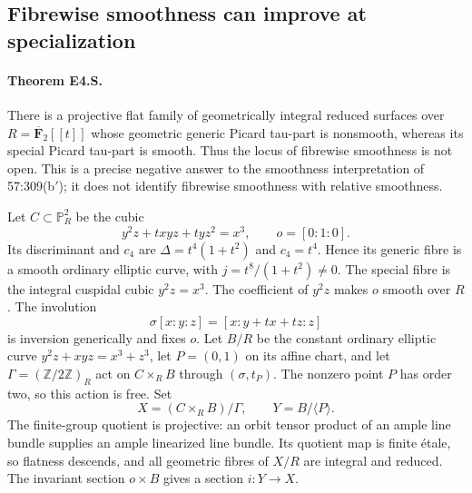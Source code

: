 \subsection{Fibrewise smoothness can improve at specialization}

\paragraph{Theorem E4.S.}
There is a projective flat family of geometrically integral reduced surfaces
over $R=\overline{\mathbf F}_2[[t]]$ whose geometric generic Picard
tau-part is nonsmooth, whereas its special Picard tau-part is smooth.
Thus the locus of fibrewise smoothness is not open. This is a precise
negative answer to the smoothness interpretation of 57:309(b$'$);
it does not identify fibrewise smoothness with relative smoothness.

Let $C\subset\mathbb P^2_R$ be the cubic
\[
 y^2z+txyz+tyz^2=x^3,\qquad o=[0:1:0].                 \tag{E4.S.1}
\]
Its discriminant and $c_4$ are
$\Delta=t^4(1+t^2)$ and $c_4=t^4$. Hence its generic fibre is a
smooth ordinary elliptic curve, with $j=t^8/(1+t^2)\ne0$.
The special fibre is the integral cuspidal cubic $y^2z=x^3$.
The coefficient of $y^2z$ makes $o$ smooth over $R$.
The involution
\[
 \sigma[x:y:z]=[x:y+tx+tz:z]                           \tag{E4.S.2}
\]
is inversion generically and fixes $o$.
Let $B/R$ be the constant ordinary elliptic curve
$y^2z+xyz=x^3+z^3$, let $P=(0,1)$ on its affine chart,
and let $\Gamma=(\mathbb Z/2\mathbb Z)_R$ act on $C\times_R B$
through $(\sigma,t_P)$. The nonzero point $P$ has order two, so this
action is free. Set
\[
 X=(C\times_R B)/\Gamma,\qquad Y=B/\langle P\rangle.
\]
The finite-group quotient is projective: an orbit tensor product of
an ample line bundle supplies an ample linearized line bundle.
Its quotient map is finite \'etale, so flatness descends, and all
geometric fibres of $X/R$ are integral and reduced. The invariant
section $o\times B$ gives a section $i:Y\to X$.

